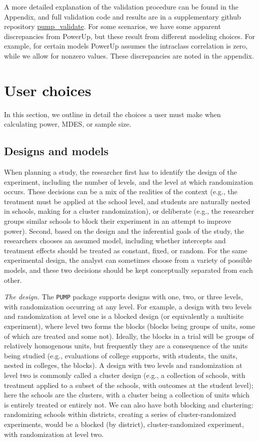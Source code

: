 \documentclass[
]{article}
\begin{document}
A more detailed explanation of the validation procedure can be found in
the Appendix, and full validation code and results are in a
supplementary github repository
\href{https://github.com/MDRCNY/pump_validate}{pump\_validate}. For some
scenarios, we have some apparent discrepancies from PowerUp, but these
result from different modeling choices. For example, for certain models
PowerUp assumes the intraclass correlation is zero, while we allow for
nonzero values. These discrepancies are noted in the appendix.

\section{User choices}
\label{sec:choices}

In this section, we outline in detail the choices a user must make when
calculating power, MDES, or sample size.

\subsection{Designs and models}
\label{sec:d_m}

When planning a study, the researcher first has to identify the design
of the experiment, including the number of levels, and the level at
which randomization occurs. These decisions can be a mix of the
realities of the context (e.g., the treatment must be applied at the
school level, and students are naturally nested in schools, making for a
cluster randomization), or deliberate (e.g., the researcher groups
similar schools to block their experiment in an attempt to improve
power). Second, based on the design and the inferential goals of the
study, the researchers chooses an assumed model, including whether
intercepts and treatment effects should be treated as constant, fixed,
or random. For the same experimental design, the analyst can sometimes
choose from a variety of possible models, and these two decisions should
be kept conceptually separated from each other.

\emph{The design.} The \texttt{PUMP} package supports designs with one,
two, or three levels, with randomization occurring at any level. For
example, a design with two levels and randomization at level one is a
blocked design (or equivalently a multisite experiment), where level two
forms the blocks (blocks being groups of units, some of which are
treated and some not). Ideally, the blocks in a trial will be groups of
relatively homogenous units, but frequently they are a consequence of
the units being studied (e.g., evaluations of college supports, with
students, the units, nested in colleges, the blocks). A design with two
levels and randomization at level two is commonly called a cluster
design (e.g., a collection of schools, with treatment applied to a
subset of the schools, with outcomes at the student level); here the
schools are the clusters, with a cluster being a collection of units
which is entirely treated or entirely not. We can also have both
blocking and clustering: randomizing schools within districts, creating
a series of cluster-randomized experiments, would be a blocked (by
district), cluster-randomized experiment, with randomization at level
two.
\end{document}
